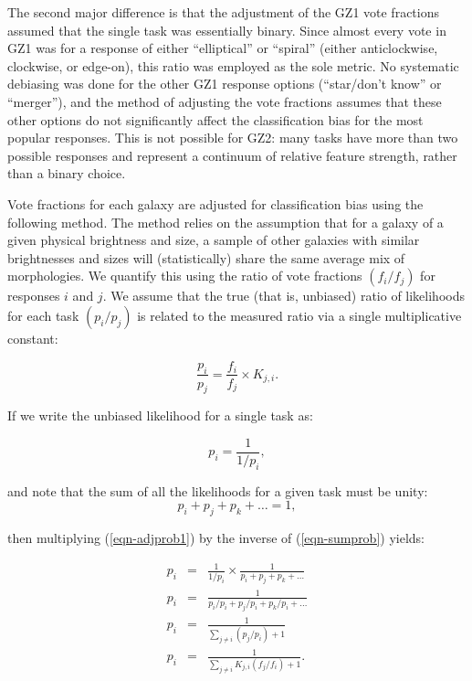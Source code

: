 \documentclass[useAMS,usenatbib]{mn2e}
\begin{document}
The second major difference is that the adjustment of the GZ1 vote fractions assumed that the single task was essentially binary. Since almost every vote in GZ1 was for a response of either ``elliptical'' or ``spiral'' (either anticlockwise, clockwise, or edge-on), this ratio was employed as the sole metric. No systematic debiasing was done for the other GZ1 response options (``star/don't know'' or ``merger''), and the method of adjusting the vote fractions assumes that these other options do not significantly affect the classification bias for the most popular responses. This is not possible for GZ2: many tasks have more than two possible responses and represent a continuum of relative feature strength, rather than a binary choice.

Vote fractions for each galaxy are adjusted for classification bias using the following method. The method relies on the assumption that for a galaxy of a given physical brightness and size, a sample of other galaxies with similar brightnesses and sizes will (statistically) share the same average mix of morphologies. We quantify this using the ratio of vote fractions $(f_i/f_j)$ for responses $i$ and $j$. We assume that the true (that is, unbiased) ratio of likelihoods for each task $(p_i/p_j)$ is related to the measured ratio via a single multiplicative constant:

\begin{equation}
\frac{p_i}{p_j} = \frac{f_i}{f_j}\times K_{j,i}.
\label{eqn-kdef}
\end{equation}

\noindent If we write the unbiased likelihood for a single task as:

\begin{equation}
p_i = \frac{1}{1/p_i},
\label{eqn-adjprob1}
\end{equation}

\noindent and note that the sum of all the likelihoods for a given task must be unity:
\begin{equation}
p_i + p_j + p_k + \dots = 1,
\label{eqn-sumprob}
\end{equation}

\noindent then multiplying (\ref{eqn-adjprob1}) by the inverse of (\ref{eqn-sumprob}) yields:

\begin{eqnarray}
p_i &=& \frac{1}{1/p_i} \times \frac{1}{p_i + p_j + p_k + \dots} \\
p_i &=& \frac{1}{p_i/p_i + p_j/p_i + p_k/p_i + \dots} \\
p_i &=& \frac{1}{\sum\limits_{j\ne i}{(p_j/p_i)} + 1} \\
p_i &=& \frac{1}{\sum\limits_{j\ne i}{K_{j,i} (f_j/f_i)} + 1}.
\label{eqnarray-adjprob2}
\end{eqnarray}
\end{document}
